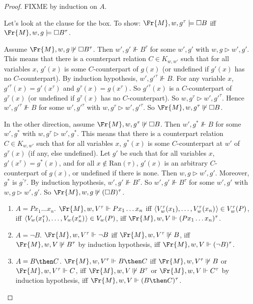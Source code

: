 \documentclass[11pt]{woarticle}
\theoremstyle{break}
\theoremstyle{nonumberplain}
\newcommand{\SAT}{\Vdash}
\newcommand{\Img}{\triangleright}
\newcommand{\1}{\;\,|\;\,}
\renewcommand{\t}[1]{\ensuremath{\langle #1  \makebox[.2ex]{}\rangle}}
\begin{document}
\begin{proof}
  FIXME
  by induction on $A$.


  Let's look at the clause for the box. To show:
  $\Fr{M},w,g^\tau \models \Box B$ iff $\Fr{M},w,g \models \Box B^\tau$.

  Assume $\Fr{M},w,g \not\SAT \Box B^\tau$. Then $w',g' \not\SAT B^\tau$ for
  some $w',g'$ with $w,g \Img w',g'$. This means that there is a counterpart
  relation $C\in K_{w,w'}$ such that for all variables $x$, $g'(x)$ is some
  $C$-counterpart of $g(x)$ (or undefined if $g'(x)$ has no $C$-counterpart). By induction hypothesis,
  $w',{g'}^\tau \not\SAT B$. For any variable $x$,
  ${g'}^\tau(x) = g'(x^\tau)$ and $g^\tau(x) = g(x^\tau)$. So
  ${g'}^\tau(x)$ is a $C$-counterpart of $g^\tau(x)$ (or undefined if ${g}^{\tau}(x)$ has no $C$-counterpart). So $w,g^{\tau} \Img w',{g'}^\tau$. Hence
  $w',{g'}^\tau \not\SAT B$ for some $w',{g'}^\tau$ with $w,g^{\tau} \Img w',{g'}^\tau$.
  So $\Fr{M},w,g^\tau \not\SAT \Box B$.

  In the other direction, assume $\Fr{M},w,g^\tau \not\SAT \Box B$. Then
  $w',g^* \not\SAT B$ for some $w',g^*$ with $w,g^{\tau} \Img w',g^*$. This
  means that there is a counterpart relation $C\in K_{w,w'}$ such that for all
  variables $x$, $g^*(x)$ is some $C$-counterpart at $w'$ of $g^\tau(x)$ (if
  any, else undefined). Let $g'$ be such that for all variables $x$,
  $g'(x^\tau) = g^*(x)$, and for all $x \not\in \text{Ran}(\tau)$, $g'(x)$ is an
  arbitrary $C$-counterpart of $g(x)$, or undefined if there is none.
  Then
  $w,g \Img w',g'$. Moreover, $g^*$ is $g^{\prime \tau}$. By induction
  hypothesis, $w',g' \not\SAT B^\tau$. So $w',g' \not\SAT B^\tau$ for some
  $w',g'$ with $w,g\Img w',g'$. So $\Fr{M},w,g \not\SAT (\Box B)^\tau$.
  
  \begin{enumerate}
  \item $A = Px_1\ldots x_n$. $\Fr{M},w,V^\tau \SAT Px_1\ldots x_n$ iff
    $\t{V^\tau_w(x_1),\ldots,V^\tau_w(x_n)} \in V^\tau_w(P)$, iff
    $\t{V_w(x_1^\tau),\ldots,V_w(x_n^\tau)} \in V_w(P)$, iff $\Fr{M},w,V
    \SAT (Px_1\ldots x_n)^\tau$.
  \item $A = \neg B$. $\Fr{M},w,V^\tau \SAT \neg B$ iff $\Fr{M},w,V^\tau
    \not\SAT B$, iff $\Fr{M},w,V \not\SAT B^\tau$ by induction hypothesis,
    iff $\Fr{M},w,V \SAT (\neg B)^\tau$.
  \item $A = B\then C$. $\Fr{M},w,V^\tau \SAT B \then C$ iff
    $\Fr{M},w,V^\tau \not\SAT B$ or $\Fr{M},w,V^\tau \SAT C$, iff
    $\Fr{M},w,V \not\SAT B^\tau$ or $\Fr{M},w,V\SAT C^\tau$ by
    induction hypothesis, iff $\Fr{M},w,V \SAT (B\then C)^\tau$.


\end{enumerate}
\end{proof}
\end{document}
